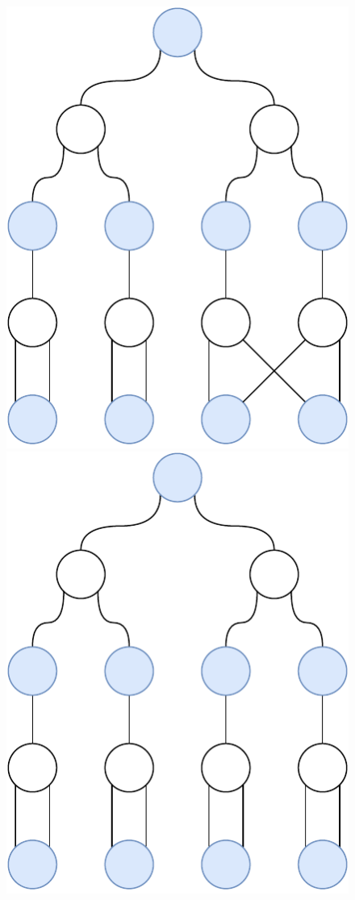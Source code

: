 \begin{figure}[H]
{      \includegraphics[scale=0.4]{diagrams/results_multigraph_n15_5.pdf}
    }
    \hfill
       {
      \centering
      \includegraphics[scale=0.4]{diagrams/results_multigraph_n15_9.pdf}
}
\end{figure}
